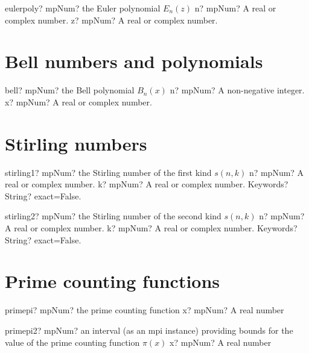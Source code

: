 \documentclass[12pt,a4paper,openany]{book}
\begin{document}
\begin{mpFunctionsExtract}
\mpFunctionTwo
{eulerpoly? mpNum? the Euler polynomial $E_n(z)$}
{n? mpNum? A real or complex number.}
{z? mpNum? A real or complex number.}
\end{mpFunctionsExtract}

\section{Bell numbers and polynomials}

\begin{mpFunctionsExtract}
\mpFunctionTwo
{bell? mpNum? the Bell polynomial $B_n(x)$}
{n? mpNum? A non-negative integer.}
{x? mpNum? A real or complex number.}
\end{mpFunctionsExtract}

\section{Stirling numbers}

\begin{mpFunctionsExtract}
\mpFunctionThree
{stirling1? mpNum? the Stirling number of the first kind $s(n,k)$}
{n? mpNum? A real or complex number.}
{k? mpNum? A real or complex number.}
{Keywords? String? exact=False.}
\end{mpFunctionsExtract}

\begin{mpFunctionsExtract}
\mpFunctionThree
{stirling2? mpNum? the Stirling number of the second kind $s(n,k)$}
{n? mpNum? A real or complex number.}
{k? mpNum? A real or complex number.}
{Keywords? String? exact=False.}
\end{mpFunctionsExtract}

\section{Prime counting functions}

\begin{mpFunctionsExtract}
\mpFunctionOne
{primepi? mpNum? the prime counting function}
{x? mpNum? A real number}
\end{mpFunctionsExtract}

\begin{mpFunctionsExtract}
\mpFunctionOne
{primepi2? mpNum? an interval (as an mpi instance) providing bounds for the value of the prime counting function $\pi(x)$}
{x? mpNum? A real number}
\end{mpFunctionsExtract}
\end{document}
